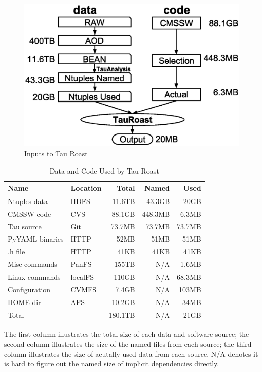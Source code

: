 \documentclass{sig-alternate}
\begin{document}
\begin{figure}[t]
\centering
\includegraphics[width=.8\columnwidth]{data-code-size.eps}
\caption{Inputs to Tau Roast}
\label{fig:data-code-size}
\end{figure}

\begin{table}[t]
    \centering
    \small
    \begin{tabular}{|l|l|r|r|r|}
        \hline
        \bf Name & \bf Location & \bf Total & \bf Named & \bf Used \\ 
        \hline
        Ntuples data    & HDFS& 11.6TB & 43.3GB & 20GB \\ \hline
        CMSSW code     & CVS & 88.1GB & 448.3MB & 6.3MB\\ \hline
        Tau source       & Git & 73.7MB & 73.7MB & 73.7MB \\ \hline
        PyYAML binaries    & HTTP & 52MB & 51MB & 51MB \\ \hline
        .h file       & HTTP& 41KB & 41KB & 41KB \\ \hline
        Misc commands & PanFS & 155TB & N/A  & 1.6MB \\ \hline
        Linux commands & localFS & 110GB &  N/A & 68.3MB \\ \hline     
        Configuration & CVMFS & 7.4GB & N/A & 103MB \\ \hline
        HOME dir& AFS &10.2GB & N/A & 34MB\\ \hline
        Total      &    & 180.1TB            & N/A & 21GB \\ \hline
    \end{tabular}
    \begin{tablenotes}
      \small
      \item The first column illustrates the total size of each data and software source; 
            the second column illustrates the size of the named files from each source;
            the third column illustrates the size of acutally used data from each source.
            N/A denotes it is hard to figure out the named size of implicit dependencies directly.        
    \end{tablenotes}
    \caption{Data and Code Used by Tau Roast}
    \label{table:size-original-real}
\end{table}
\end{document}
